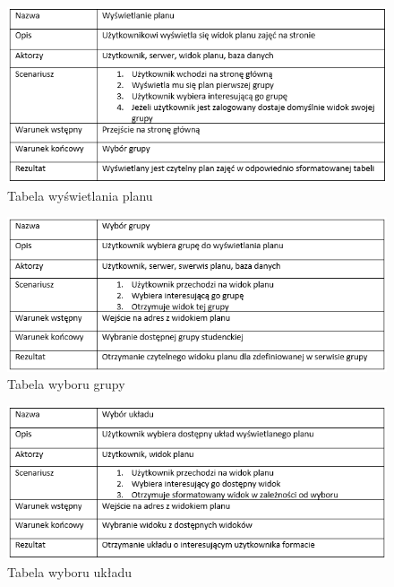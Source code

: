 \documentclass[a4paper,11pt]{uzreport}
\begin{document}
     \begin{figure}[ht!]
        \centering
        \includegraphics[width=6in]{pictures/wyswietlanie planu.PNG}
        \caption{Tabela wyświetlania planu}
        \label{fig7}
     \end{figure}
     \begin{figure}[ht!]
        \centering
        \includegraphics[width=6in]{pictures/wybor grupy.PNG}
        \caption{Tabela wyboru grupy}
        \label{fig8}
     \end{figure}
     \begin{figure}[ht!]
        \centering
        \includegraphics[width=6in]{pictures/wybor ukladu.PNG}
        \caption{Tabela wyboru układu}
        \label{fig9}
     \end{figure}
\clearpage
\end{document}
